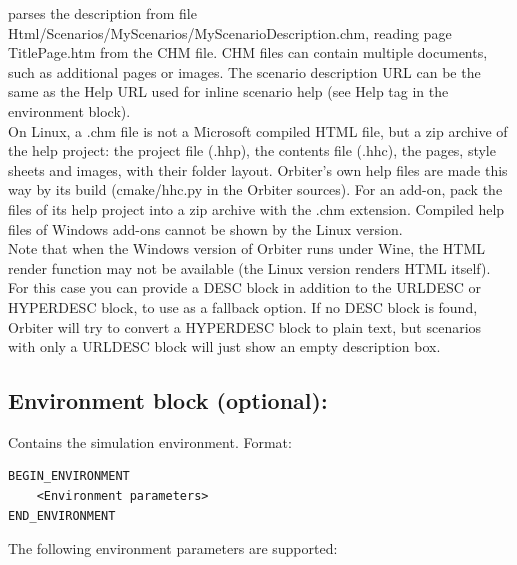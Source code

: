 \documentclass[Orbiter Developer Manual.tex]{subfiles}
\begin{document}
\noindent
parses the description from file Html/Scenarios/MyScenarios/MyScenarioDescription.chm, reading page TitlePage.htm from the CHM file. CHM files can contain multiple documents, such as additional pages or images. The scenario description URL can be the same as the Help URL used for inline scenario help (see Help tag in the environment block).\\
On Linux, a .chm file is not a Microsoft compiled HTML file, but a zip archive of the help project: the project file (.hhp), the contents file (.hhc), the pages, style sheets and images, with their folder layout. Orbiter's own help files are made this way by its build (cmake/hhc.py in the Orbiter sources). For an add-on, pack the files of its help project into a zip archive with the .chm extension. Compiled help files of Windows add-ons cannot be shown by the Linux version.\\
Note that when the Windows version of Orbiter runs under Wine, the HTML render function may not be available (the Linux version renders HTML itself). For this case you can provide a DESC block in addition to the URLDESC or HYPERDESC block, to use as a fallback option. If no DESC block is found, Orbiter will try to convert a HYPERDESC block to plain text, but scenarios with only a URLDESC block will just show an empty description box.


\subsection*{Environment block (optional):}
Contains the simulation environment. Format:

\begin{lstlisting}[language=OSFS]
BEGIN_ENVIRONMENT
	<Environment parameters>
END_ENVIRONMENT
\end{lstlisting}

\noindent
The following environment parameters are supported:
\end{document}
